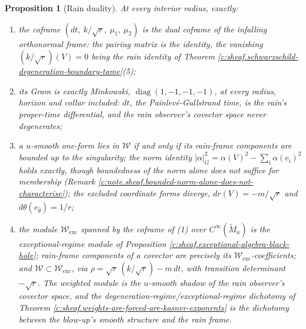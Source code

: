 \documentclass[11pt]{article}
\newtheorem{proposition}[theorem]{Proposition}
\theoremstyle{definition}
\theoremstyle{plain}
\providecommand{\Mt}{}\renewcommand{\Mt}{\widetilde{M}}
\providecommand{\dtPG}{}\renewcommand{\dtPG}{dt}
\providecommand{\shW}{}\renewcommand{\shW}{\mathcal{W}}
\begin{document}
\begin{proposition}[Rain duality]\label{c:sheaf.rain-duality}
At every interior radius, exactly:
\begin{enumerate}
\item the coframe $(\dtPG,\ k/\sqrt r,\ \mu_1,\ \mu_2)$ is the \emph{dual coframe} of the infalling orthonormal frame: the pairing matrix is the identity, the vanishing $(k/\sqrt r)(V) = 0$ being the rain identity of Theorem \ref{c:sheaf.schwarzschild-degeneration-boundary-tame}(5);
\item its Gram is exactly Minkowski, $\operatorname{diag}(1,-1,-1,-1)$, at every radius, horizon and collar included: $\dtPG$, the Painlev\'e-Gullstrand time, is the rain's proper-time differential, and the rain observer's covector space never degenerates;
\item a $u$-smooth one-form lies in $\shW$ if and only if its rain-frame components are bounded up to the singularity; the norm identity $|\alpha|_G^2 = \alpha(V)^2 - \sum_i \alpha(e_{\hat\imath})^2$ holds exactly, though boundedness of the norm alone does not suffice for membership (Remark \ref{c:note.sheaf.bounded-norm-alone-does-not-characterise}); the excluded coordinate forms diverge, $dr(V) = -m/\sqrt r$ and $d\theta(e_{\hat\theta}) = 1/r$;
\item the module $\shW_{\mathrm{exc}}$ spanned by the coframe of (1) over $C^\infty(\Mt_u)$ is the exceptional-regime module of Proposition \ref{c:sheaf.exceptional-algebra-black-hole}; rain-frame components of a covector are precisely its $\shW_{\mathrm{exc}}$-coefficients; and $\shW \subset \shW_{\mathrm{exc}}$, via $\rho = \sqrt r\,(k/\sqrt r) - m\,\dtPG$, with transition determinant $-\sqrt r$. The weighted module is the $u$-smooth shadow of the rain observer's covector space, and the degeneration-regime/exceptional-regime dichotomy of Theorem \ref{c:sheaf.weights-are-forced-are-kasner-exponents} is the dichotomy between the blow-up's smooth structure and the rain frame.
\end{enumerate}
\end{proposition}
\end{document}
